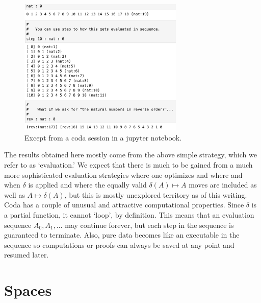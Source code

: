 \documentclass[11pt]{article}
\begin{document}
\begin{figure}[h]
\centering
\includegraphics[width=0.7\textwidth]{nat.png}
\caption{Except from a coda session in a jupyter notebook\cite{github}.}
\end{figure} 

    The results obtained here mostly come from the above simple strategy, which we refer to as `evaluation.'  
We expect that there is much to be gained from a much more sophisticated evaluation strategies 
where one optimizes and where and when $\delta$ is applied and where the equally valid $\delta(A)\mapsto A$ moves are included as well 
as $A\mapsto\delta(A)$, but this is mostly unexplored territory as of this writing.  Coda has a couple of unusual and attractive computational properties.  
Since $\delta$ is a partial function, it cannot `loop', by definition.  This means that an evaluation sequence $A_0,A_1,\dots$ may continue forever, 
but each step in the sequence is guaranteed to terminate.  Also, pure data becomes like an executable in the sequence so computations or 
proofs can always be saved at any point and resumed later.  

\section{Spaces}
\end{document}
